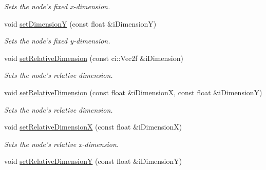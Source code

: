 \begin{DoxyCompactItemize}
\begin{DoxyCompactList}\small\item\em Sets the node's fixed x-\/dimension. \end{DoxyCompactList}\item 
\hypertarget{class_gui_base_a465d2dac52ef361d32fc0da11fc96037}{void \hyperlink{class_gui_base_a465d2dac52ef361d32fc0da11fc96037}{set\-Dimension\-Y} (const float \&i\-Dimension\-Y)}\label{class_gui_base_a465d2dac52ef361d32fc0da11fc96037}

\begin{DoxyCompactList}\small\item\em Sets the node's fixed y-\/dimension. \end{DoxyCompactList}\item 
\hypertarget{class_gui_base_aec9af0c20f3450a724b7b2351285bb18}{void \hyperlink{class_gui_base_aec9af0c20f3450a724b7b2351285bb18}{set\-Relative\-Dimension} (const ci\-::\-Vec2f \&i\-Dimension)}\label{class_gui_base_aec9af0c20f3450a724b7b2351285bb18}

\begin{DoxyCompactList}\small\item\em Sets the node's relative dimension. \end{DoxyCompactList}\item 
\hypertarget{class_gui_base_a449cadd489954fcf58a3563b410f3c60}{void \hyperlink{class_gui_base_a449cadd489954fcf58a3563b410f3c60}{set\-Relative\-Dimension} (const float \&i\-Dimension\-X, const float \&i\-Dimension\-Y)}\label{class_gui_base_a449cadd489954fcf58a3563b410f3c60}

\begin{DoxyCompactList}\small\item\em Sets the node's relative dimension. \end{DoxyCompactList}\item 
\hypertarget{class_gui_base_a7813f46fcb0b4072484ecd71f41998de}{void \hyperlink{class_gui_base_a7813f46fcb0b4072484ecd71f41998de}{set\-Relative\-Dimension\-X} (const float \&i\-Dimension\-X)}\label{class_gui_base_a7813f46fcb0b4072484ecd71f41998de}

\begin{DoxyCompactList}\small\item\em Sets the node's relative x-\/dimension. \end{DoxyCompactList}\item 
\hypertarget{class_gui_base_a52fe756effdc1e619fad534b67f168ec}{void \hyperlink{class_gui_base_a52fe756effdc1e619fad534b67f168ec}{set\-Relative\-Dimension\-Y} (const float \&i\-Dimension\-Y)}\label{class_gui_base_a52fe756effdc1e619fad534b67f168ec}


\end{DoxyCompactItemize}
